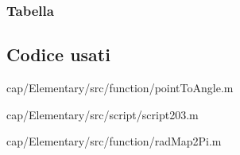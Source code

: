 \subsubsection{Tabella}    

\pagebreak

\subsection{Codice usati}

{cap/Elementary/src/function/pointToAngle.m}


{cap/Elementary/src/script/script203.m}


{cap/Elementary/src/function/radMap2Pi.m}